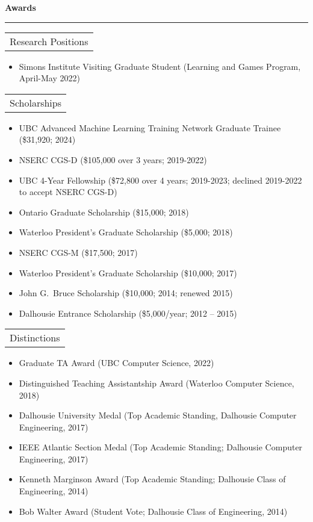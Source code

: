 \documentclass{article}
\newcommand{\heading}[1]
{
	\vspace{3pt}
	{\bf #1} 
	\vspace{-6pt}
	
	\rule{\linewidth}{0.4pt}
}
\begin{document}
\heading{Awards}
\begin{tabularx}{\textwidth}{X}
    Research Positions \\
\end{tabularx}
\begin{itemize}
    \item Simons Institute Visiting Graduate Student (Learning and Games Program, April-May 2022)  
\end{itemize}
\begin{tabularx}{\textwidth}{X}
    Scholarships \\
\end{tabularx}
\begin{itemize}
\item UBC Advanced Machine Learning Training Network Graduate Trainee (\$31,920; 2024)
\item NSERC CGS-D (\$105,000 over 3 years; 2019-2022)
\item UBC 4-Year Fellowship (\$72,800 over 4 years; 2019-2023; declined 2019-2022 to accept NSERC CGS-D)
\item Ontario Graduate Scholarship (\$15,000; 2018)
\item Waterloo President's Graduate Scholarship (\$5,000; 2018)
\item NSERC CGS-M (\$17,500; 2017)
\item Waterloo President's Graduate Scholarship (\$10,000; 2017)
\item John G.~Bruce Scholarship (\$10,000; 2014; renewed 2015)
\item Dalhousie Entrance Scholarship (\$5,000/year; 2012 -- 2015)
\end{itemize}
\begin{tabularx}{\textwidth}{X}
    Distinctions \\
\end{tabularx}
\begin{itemize}
\item Graduate TA Award (UBC Computer Science, 2022) 
\item Distinguished Teaching Assistantship Award (Waterloo Computer Science, 2018)
\item Dalhousie University Medal (Top Academic Standing, Dalhousie Computer Engineering, 2017)
\item IEEE Atlantic Section Medal (Top Academic Standing; Dalhousie Computer Engineering, 2017)
\item Kenneth Marginson Award (Top Academic Standing; Dalhousie Class of Engineering, 2014)
\item Bob Walter Award (Student Vote; Dalhousie Class of Engineering, 2014) 
\end{itemize}
\end{document}
